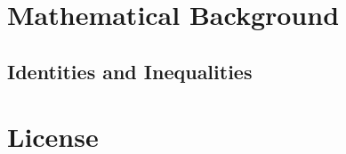 \begin{appendices}

\chapter{Mathematical Background}
\section{Identities and Inequalities}

\chapter{License}
\doclicenseFullText

\end{appendices}
